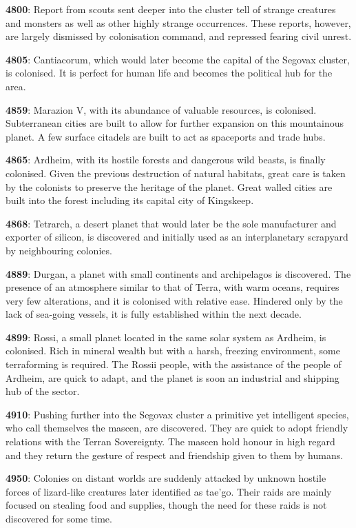 \documentclass{scrbook}
\begin{document}
\textbf{4800}: Report from scouts sent deeper into the cluster tell of strange creatures and monsters as well as other highly strange occurrences. These reports, however, are largely dismissed by colonisation command, and repressed fearing civil unrest.

\textbf{4805}: Cantiacorum, which would later become the capital of the Segovax cluster, is colonised. It is perfect for human life and becomes the political hub for the area.

\textbf{4859}: Marazion V, with its abundance of valuable resources, is colonised. Subterranean cities are built to allow for further expansion on this mountainous planet. A few surface citadels are built to act as spaceports and trade hubs.

\textbf{4865}: Ardheim, with its hostile forests and dangerous wild beasts, is finally colonised. Given the previous destruction of natural habitats, great care is taken by the colonists to preserve the heritage of the planet. Great walled cities are built into the forest including its capital city of Kingskeep.

\textbf{4868}: Tetrarch, a desert planet that would later be the sole manufacturer and exporter of silicon, is discovered and initially used as an interplanetary scrapyard by neighbouring colonies.

\textbf{4889}: Durgan, a planet with small continents and archipelagos is discovered. The presence of an atmosphere similar to that of Terra, with warm oceans, requires very few alterations, and it is colonised with relative ease. Hindered only by the lack of sea-going vessels, it is fully established within the next decade.

\textbf{4899}: Rossi, a small planet located in the same solar system as Ardheim, is colonised. Rich in mineral wealth but with a harsh, freezing environment, some terraforming is required. The Rossii people, with the assistance of the people of Ardheim, are quick to adapt, and the planet is soon an industrial and shipping hub of the sector.

\textbf{4910}: Pushing further into the Segovax cluster a primitive yet intelligent species, who call themselves the mascen, are discovered. They are quick to adopt friendly relations with the Terran Sovereignty. The mascen hold honour in high regard and they return the gesture of respect and friendship given to them by humans.

\textbf{4950}: Colonies on distant worlds are suddenly attacked by unknown hostile forces of lizard-like creatures later identified as tae'go. Their raids are mainly focused on stealing food and supplies, though the need for these raids is not discovered for some time.
\end{document}
